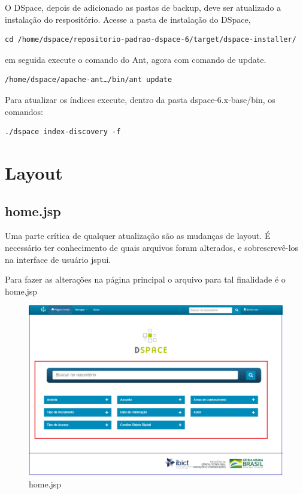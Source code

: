 \documentclass[12pt,hidelinks]{article}
\begin{document}
O DSpace, depois de adicionado as pastas de backup, deve ser atualizado a instalação do respositório. Acesse a pasta de instalação do DSpace,
\begin{verbatim}
cd /home/dspace/repositorio-padrao-dspace-6/target/dspace-installer/
\end{verbatim}
em seguida execute o comando do Ant, agora com comando de update.
\begin{verbatim}
/home/dspace/apache-ant…/bin/ant update
\end{verbatim}

Para atualizar os índices execute, dentro da pasta dspace-6.x-base/bin, os comandos:
\begin{verbatim}
./dspace index-discovery -f
\end{verbatim}

\newpage
\section{Layout}
\newpage

\subsection{home.jsp}

Uma parte crítica de qualquer atualização são as mudanças de layout. É necessário ter conhecimento de quais arquivos foram alterados, e sobrescrevê-los na interface de usuário jspui. 

Para fazer as alterações na página principal o arquivo para tal finalidade é o home.jsp

        \begin{figure}[!htp]
                \centering
                \includegraphics[scale=0.5]{figura/home.png}
                \caption{home.jsp}
            \label{Rotulo}
        \end{figure}
\end{document}
